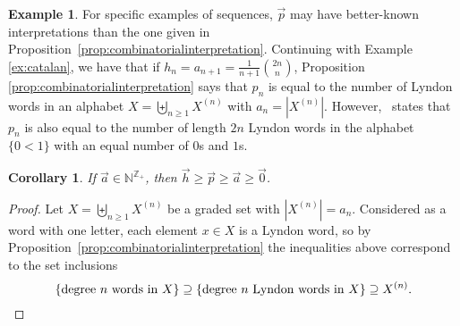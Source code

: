 \documentclass[11pt]{amsart}
\newtheorem{corollary}[theorem]{Corollary}
\theoremstyle{definition}
\newtheorem{example}[theorem]{Example}
\numberwithin{equation}{section}
\def\NN{{\mathbb N}}
\def\ZZ{{\mathbb Z}}
\begin{document}
\begin{example}\label{ex:balancedLyndon}
For specific examples of sequences,
$\vec{p}$ may have better-known interpretations
than the one given in  Proposition~\ref{prop:combinatorialinterpretation}.
Continuing with Example \ref{ex:catalan}, we have that if
$h_n = a_{n+1} = \frac{1}{n+1}\binom{2n}{n}$, Proposition
\ref{prop:combinatorialinterpretation} says that $p_n$ is equal to the number
of Lyndon words in an alphabet $X = \biguplus_{n\geq1} X^{(n)}$ with $a_n = |X^{(n)}|$.
However,~\cite[\href{https://oeis.org/A022553}{A022553}]{OEIS} states that $p_n$ is also equal to the number of
length $2n$ Lyndon words in the alphabet $\{0 < 1\}$ with an equal number of $0$s and $1$s.
\end{example}

\begin{corollary}
If $\vec{a} \in \NN^{\ZZ_+}$, then $\vec{h} \geq \vec{p} \geq \vec{a} \geq \vec{0}$.
\end{corollary}
\begin{proof}
Let $X = \biguplus_{n \ge 1} X^{(n)}$ be a graded set with $|X^{(n)}| = a_{n}$.  
Considered as a word with one letter, each element $x \in X$ is a Lyndon word, so by Proposition~\ref{prop:combinatorialinterpretation} the inequalities above correspond to the set inclusions
\[
\{\text{degree $n$ words in $X$}\} 
\supseteq \{\text{degree $n$ Lyndon words in $X$}\} 
\supseteq X^{(n)}. \qedhere
\]
\end{proof}
\end{document}
